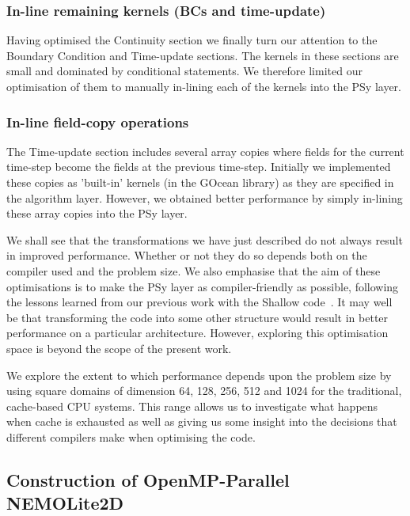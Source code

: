 \documentclass[journal]{IEEEtran}
\begin{document}
\subsubsection{In-line remaining kernels (BCs and time-update)}
\label{sec_inline_all_kernels}

Having optimised the Continuity section we finally turn our attention
to the Boundary Condition and Time-update sections. The kernels in
these sections are small and dominated by conditional statements.  We
therefore limited our optimisation of them to manually in-lining each
of the kernels into the PSy layer.

\subsubsection{In-line field-copy operations}
\label{sec_inline_fldcopy}

The Time-update section includes several array copies where fields for
the current time-step become the fields at the previous time-step.
Initially we implemented these copies as 'built-in' kernels (in the
GOcean library) as they are specified in the algorithm layer. However,
we obtained better performance by simply in-lining these array copies
into the PSy layer.

We shall see that the transformations we have just described do not
always result in improved performance. Whether or not they do so
depends both on the compiler used and the problem size. We also
emphasise that the aim of these optimisations is to make the PSy layer
as compiler-friendly as possible, following the lessons learned from
our previous work with the Shallow code~\cite{shallow_psykal}. It may
well be that transforming the code into some other structure would
result in better performance on a particular architecture. However,
exploring this optimisation space is beyond the scope of the present
work.

We explore the extent to which performance depends upon the problem
size by using square domains of dimension 64, 128, 256, 512 and 1024
for the traditional, cache-based CPU systems. This range allows us to
investigate what happens when cache is exhausted as well as giving us
some insight into the decisions that different compilers make when
optimising the code.

\subsection{Construction of OpenMP-Parallel NEMOLite2D}
\label{sec_omp_steps}
\end{document}
